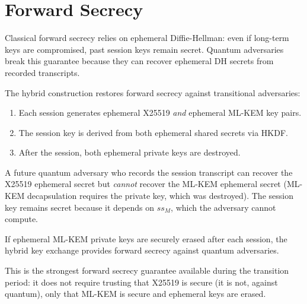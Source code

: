 \section{Forward Secrecy}

\label{sec:forward-secrecy}

Classical forward secrecy relies on ephemeral Diffie-Hellman: even if long-term keys
are compromised, past session keys remain secret. Quantum adversaries break this
guarantee because they can recover ephemeral DH secrets from recorded transcripts.

The hybrid construction restores forward secrecy against transitional adversaries:

\begin{enumerate}[leftmargin=2em]
  \item Each session generates ephemeral X25519 \emph{and} ephemeral ML-KEM key pairs.
  \item The session key is derived from both ephemeral shared secrets via HKDF.
  \item After the session, both ephemeral private keys are destroyed.
\end{enumerate}

A future quantum adversary who records the session transcript can recover the X25519
ephemeral secret but \emph{cannot} recover the ML-KEM ephemeral secret (ML-KEM
decapsulation requires the private key, which was destroyed). The session key remains
secret because it depends on $ss_M$, which the adversary cannot compute.

\begin{proposition}
If ephemeral ML-KEM private keys are securely erased after each session, the hybrid
key exchange provides forward secrecy against quantum adversaries.
\end{proposition}

This is the strongest forward secrecy guarantee available during the transition
period: it does not require trusting that X25519 is secure (it is not, against
quantum), only that ML-KEM is secure and ephemeral keys are erased.

